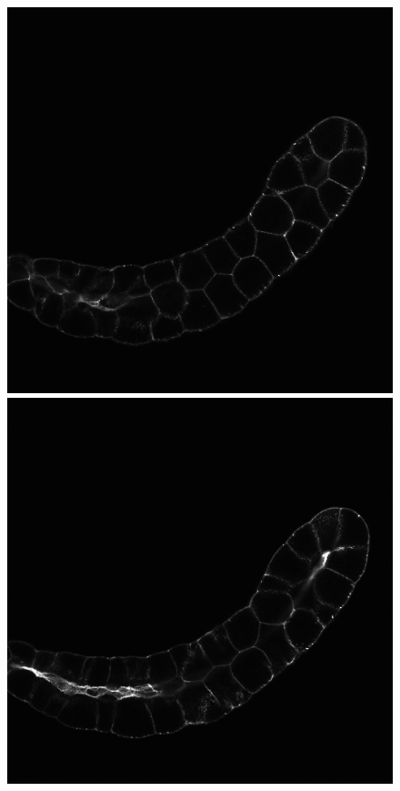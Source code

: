 \begin{figure}[ht]
\centering
\includegraphics[scale=0.2]{img/raw 04_1a Z=77.png}
\vspace*{1mm}
\includegraphics[scale=0.2]{img/raw 04_1a Z=100.png}

\end{figure}
